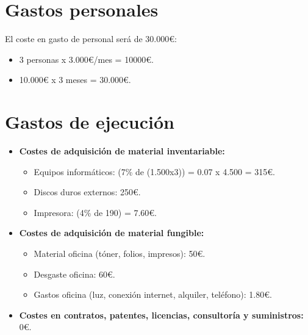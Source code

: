 \section{Gastos personales}
El coste en gasto de personal será de 30.000\euro:
\begin{itemize}
	\item 3 personas x 3.000\euro/mes = 10000\euro.
	\item 10.000\euro \hspace{1pt} x 3 meses = 30.000\euro.
\end{itemize} 


\section{Gastos de ejecución}
\begin{itemize}
	\item \textbf{Costes de adquisición de material inventariable:}
		\begin{itemize}
			\item Equipos informáticos: (7\% de (1.500x3)) = 0.07 x 4.500 = 315\euro.
			\item Discos duros externos: 250\euro.
			\item Impresora: (4\% de 190) = 7.60\euro.
		\end{itemize}
	\item \textbf{Costes de adquisición de material fungible:}
		\begin{itemize}
			\item Material oficina (tóner, folios, impresos): 50\euro.
			\item Desgaste oficina: 60\euro.
			\item Gastos oficina (luz, conexión internet, alquiler, teléfono): 1.80\euro.
		\end{itemize}
	\item \textbf{Costes en contratos, patentes, licencias, consultoría y suministros:} 0\euro.	
\end{itemize}

	
